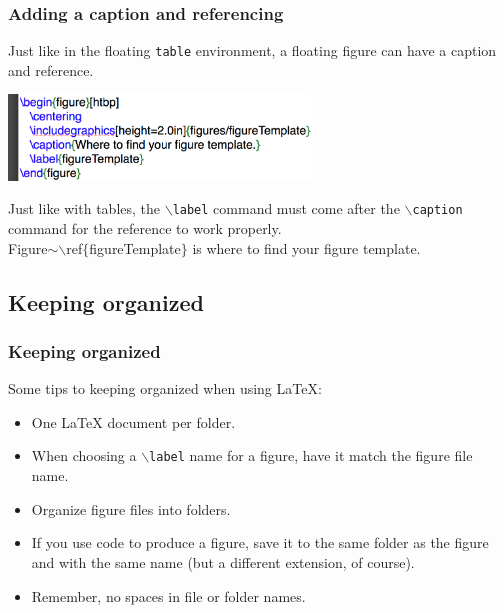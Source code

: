 \documentclass[slidestop,compress,mathserif]{beamer}
\begin{document}
\begin{frame} \frametitle{Adding a caption and referencing}
Just like in the floating \texttt{\color{highlight}table} environment, a floating figure can have a caption and reference.
\begin{center}
\includegraphics[height=0.9in]{basicsOfLatex/figures/figureWithCaptionLabel}
\end{center}
Just like with tables, the \texttt{\color{command}$\backslash$label} command must come after the \texttt{\color{command}$\backslash$caption} command for the reference to work properly.
\vspace{5mm} \\
Figure$\sim${\color{command}$\backslash$ref}{\color{braces}$\{${\color{black}figureTemplate}$\}$} is where to find your figure template.
\end{frame}

\subsection[Keeping organized]{Keeping organized}
\begin{frame} \frametitle{Keeping organized}
Some tips to keeping organized when using LaTeX:
\begin{itemize}
\item One LaTeX document per folder.
\item When choosing a \texttt{\color{command}$\backslash$label} name for a figure, have it match the figure file name.
\item Organize figure files into folders.
\item If you use code to produce a figure, save it to the same folder as the figure and with the same name (but a different extension, of course).
\item Remember, no spaces in file or folder names.
\end{itemize}
\end{frame}
\end{document}
